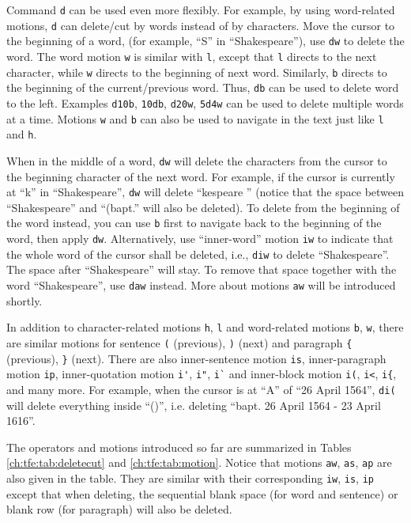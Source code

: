 Command \verb|d| can be used even more flexibly. For example, by using word-related motions, \verb|d| can delete/cut by words instead of by characters. Move the cursor to the beginning of a word, (for example, ``S'' in ``Shakespeare''), use \verb|dw| to delete the word. The word motion \verb|w| is similar with \verb|l|, except that \verb|l| directs to the next character, while \verb|w| directs to the beginning of next word. Similarly, \verb|b| directs to the beginning of the current/previous word. Thus, \verb|db| can be used to delete word to the left. Examples \verb|d10b|, \verb|10db|, \verb|d20w|, \verb|5d4w| can be used to delete multiple words at a time. Motions \verb|w| and \verb|b| can also be used to navigate in the text just like \verb|l| and \verb|h|.

When in the middle of a word, \verb|dw| will delete the characters from the cursor to the beginning character of the next word. For example, if the cursor is currently at ``k'' in ``Shakespeare'', \verb|dw| will delete ``kespeare '' (notice that the space between ``Shakespeare'' and ``(bapt.'' will also be deleted). To delete from the beginning of the word instead, you can use \verb|b| first to navigate back to the beginning of the word, then apply \verb|dw|. Alternatively, use ``inner-word'' motion \verb|iw| to indicate that the whole word of the cursor shall be deleted, i.e., \verb|diw| to delete ``Shakespeare''. The space after ``Shakespeare'' will stay. To remove that space together with the word ``Shakespeare'', use \verb|daw| instead. More about motions \verb|aw| will be introduced shortly.

In addition to character-related motions \verb|h|, \verb|l| and word-related motions  \verb|b|, \verb|w|, there are similar motions for sentence \verb|(| (previous), \verb|)| (next) and paragraph \verb|{| (previous), \verb|}| (next). There are also inner-sentence motion \verb|is|, inner-paragraph motion \verb|ip|, inner-quotation motion \verb|i'|, \verb|i"|, \verb|i`| and inner-block motion \verb|i(|, \verb|i<|, \verb|i{|, and many more. For example, when the cursor is at ``A'' of ``26 April 1564'', \verb|di(| will delete everything inside ``()'', i.e. deleting ``bapt. 26 April 1564 - 23 April 1616''.

The operators and motions introduced so far are summarized in Tables \ref{ch:tfe:tab:deletecut} and \ref{ch:tfe:tab:motion}. Notice that motions \verb|aw|, \verb|as|, \verb|ap| are also given in the table. They are similar with their corresponding \verb|iw|, \verb|is|, \verb|ip| except that when deleting, the sequential blank space (for word and sentence) or blank row (for paragraph) will also be deleted.

